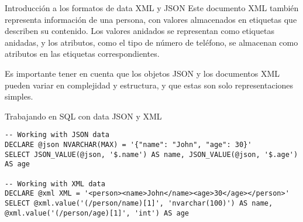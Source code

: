\begin{frame}[fragile]{Introducción a los formatos de data XML y JSON}
Este documento XML también representa información de una persona, con
valores almacenados en etiquetas que describen su contenido. Los valores
anidados se representan como etiquetas anidadas, y los atributos, como
el tipo de número de teléfono, se almacenan como atributos en las
etiquetas correspondientes.

Es importante tener en cuenta que los objetos JSON y los documentos XML
pueden variar en complejidad y estructura, y que estas son solo
representaciones simples.
\end{frame}

\begin{frame}[fragile]{Trabajando en SQL con data JSON y XML}
\protect\hypertarget{trabajando-en-sql-con-data-json-y-xml}{}
\begin{verbatim}
-- Working with JSON data
DECLARE @json NVARCHAR(MAX) = '{"name": "John", "age": 30}'
SELECT JSON_VALUE(@json, '$.name') AS name, JSON_VALUE(@json, '$.age') AS age

-- Working with XML data
DECLARE @xml XML = '<person><name>John</name><age>30</age></person>'
SELECT @xml.value('(/person/name)[1]', 'nvarchar(100)') AS name, @xml.value('(/person/age)[1]', 'int') AS age

\end{verbatim}
\end{frame}

\begin{frame}{}
\protect\hypertarget{section}{}
\end{frame}
